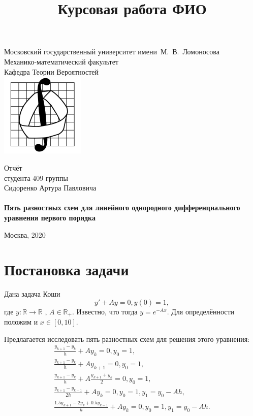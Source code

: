 \documentclass[12 pt, russian]{article}
\title{Курсовая работа ФИО}
\def\bbr{{\mathbb R}}
\newcommand\beq{\begin{equation}}
\newcommand\eeq{\end{equation}}
\newcommand\bea{\begin{eqnarray}}
\newcommand\eea{\end{eqnarray}}
\begin{document}
\thispagestyle{empty}
\newtheorem{Thm}{Теорема}[section]
\newtheorem{Lem}{Лемма}[section]
\newtheorem{Rem}{Замечание}[section]
\newtheorem{Co}{Следствие}[section]
\theoremstyle{definition}
\newtheorem{Exam}{Пример}[section]
\newtheorem{Dfn}{Определение}[section]
\sloppy
\begin{titlepage}
\begin{center}
Московский государственный университет имени~М.~В.~Ломоносова\\
Механико-математический факультет\\
Кафедра Теории Вероятностей\\
\centering
\includegraphics[width=0.3\textwidth]{mechmath.jpg}

\vspace*{100pt} Отчёт\\
студента 409 группы \\
Сидоренко Артура Павловича \\
\vspace{10pt} {\Large{\textbf{}}\\}
\textbf{Пять разностных схем для линейного однородного дифференциального уравнения первого порядка}
\vspace*{40pt}


\vspace*{\fill} Москва, 2020
\end{center}
\end{titlepage}

\section{Постановка задачи}
Дана задача Коши
\beq
y' + Ay = 0, y(0) = 1,
\eeq
где $y\colon \bbr \rightarrow \bbr$ , $A \in \bbr_+$. Известно, что тогда $y = e^{-Ax}$.  Для определённости положим и $x \in [0, 10]$.

Предлагается исследовать пять разностных схем для решения этого уравнения:
\bea
\frac{y_{k+1} - y_k}{h} + Ay_k = 0, y_0 = 1, \\
\frac{y_{k+1} - y_k}{h} + Ay_{k+1} = 0,   y_0 = 1,\\
\frac{y_{k+1} - y_k}{h} + A \frac{y_{k+1} + y_k}{2} = 0,  y_0 = 1,\\
\frac{y_{k+1} - y_{k-1}}{2h} + Ay_k = 0,   y_0 = 1, y_1 = y_0 - Ah,\\
\frac{1.5 y_{k+1} - 2 y_k + 0.5 y_{k-1}}{h} + Ay_k = 0,  y_0 = 1,  y_1 = y_0 - Ah.\\
\eea
\end{document}
